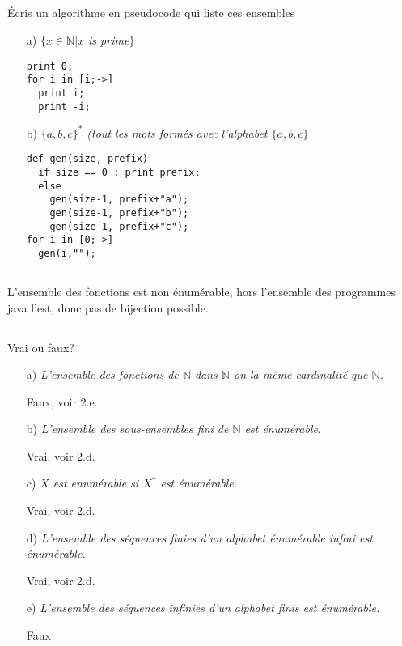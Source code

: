 \subsection{}

Écris un algorithme en pseudocode qui liste ces ensembles

\begin{itemize}
	\item[a)]\textit{$\{x\in\mathbb{N}|x$ is prime$\}$}
	
	\begin{lstlisting}[frame=single]
print 0;
for i in [i;->]
  print i;
  print -i;
	\end{lstlisting}	
	
	\item[b)]\textit{$\{a,b,c\}^*$ (tout les mots formés avec l'alphabet $\{a,b,c\}$}
	
	\begin{lstlisting}[frame=single]
def gen(size, prefix)
  if size == 0 : print prefix;
  else
    gen(size-1, prefix+"a");
    gen(size-1, prefix+"b");
    gen(size-1, prefix+"c");
for i in [0;->]
  gen(i,"");
	\end{lstlisting}	
\end{itemize}

\subsection{}
L’ensemble des fonctions est non énumérable, hors l’ensemble des programmes java l’est, donc pas de bijection possible.

\subsection{}
Vrai ou faux?
\begin{itemize}
	\item[a)]\textit{L'ensemble des fonctions de $\mathbb{N}$ dans $\mathbb{N}$ on la même cardinalité que $\mathbb{N}$.}

	Faux, voir 2.e.	
	
	\item[b)]\textit{L'ensemble des sous-ensembles fini de $\mathbb{N}$ est énumérable.}

	Vrai, voir 2.d.		
	
	\item[c)]\textit{$X$ est enumérable si $X^*$ est énumérable.}
	
	Vrai, voir 2.d.		
	
	\item[d)]\textit{L'ensemble des séquences finies d'un alphabet énumérable infini est énumérable.}

	Vrai, voir 2.d.		
		
	\item[e)]\textit{L'ensemble des séquences infinies d'un alphabet finis est énumérable.}
	
	Faux
\end{itemize}
